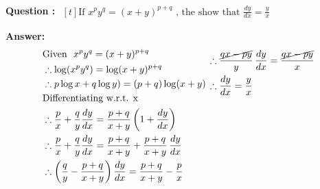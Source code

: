 \documentclass{beamer}
\begin{document}
\frame
{ \textbf{Question :} 
$\begin{aligned}[t] 
\text{If \ } x^p y^q = (x+y)^{p+q} \text{\ , \ the show that \ \  } \frac{dy}{dx}=\frac{y}{x}
\end{aligned}$

\textbf{Answer:}
\begin{equation} \nonumber
\begin{alignedat}{4}
& \text{Given \ } x^py^q = (x+y)^{p+q} \\
& \therefore \log (x^py^q) = \log (x+y)^{p+q} \\
& \therefore p\log x + q\log y) = (p+q)\log (x+y) \\
& \text{Differentiating w.r.t. x \ }\\
& \therefore \frac{p}{x}+\frac{q}{y}\frac{dy}{dx} = \frac{p+q}{x+y}\left( 1+\frac{dy}{dx}\right)\\
& \therefore \frac{p}{x}+\frac{q}{y}\frac{dy}{dx} = \frac{p+q}{x+y} + \frac{p+q}{x+y}\,\frac{dy}{dx}\\
& \therefore \left( \frac{q}{y}-\frac{p+q}{x+y} \right)  \frac{dy}{dx} = \frac{p+q}{x+y} - \frac{p}{x}\\
\end{alignedat}
\,
\begin{alignedat}{4}
& \therefore \frac{\cancel{qx - py}}{y} \,  \frac{dy}{dx} =  \frac{\cancel{qx - py}}{x}\\
& \therefore \frac{dy}{dx}=\frac{y}{x}\\
& \\
& \\
& \\
& \\
& \\
& \\
\end{alignedat}
\end{equation}


}

\end{document}
